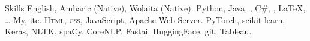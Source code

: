 
\begin{rubric}{Skills}
\entry*[Languages]
	English, Amharic (Native), Wolaita (Native).
	 Python, Java, , C\#, , \LaTeX, \ldots
\entry*[Databases]
	My, ite.
	\textsc{Html, css}, JavaScript, Apache Web Server.
\entry*[Technologies]
	PyTorch, scikit-learn, Keras, NLTK, spaCy, CoreNLP, Fastai, HuggingFace, git, Tableau.
\end{rubric}
